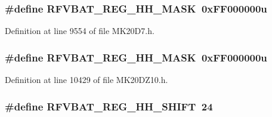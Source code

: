 \subsubsection[{\texorpdfstring{R\+F\+V\+B\+A\+T\+\_\+\+R\+E\+G\+\_\+\+H\+H\+\_\+\+M\+A\+SK}{RFVBAT_REG_HH_MASK}}]{\setlength{\rightskip}{0pt plus 5cm}\#define R\+F\+V\+B\+A\+T\+\_\+\+R\+E\+G\+\_\+\+H\+H\+\_\+\+M\+A\+SK~0x\+F\+F000000u}\hypertarget{group___r_f_v_b_a_t___register___masks_gad2932f13b6d26fa7ccb982b9cffcd184}{}\label{group___r_f_v_b_a_t___register___masks_gad2932f13b6d26fa7ccb982b9cffcd184}


Definition at line 9554 of file M\+K20\+D7.\+h.

\subsubsection[{\texorpdfstring{R\+F\+V\+B\+A\+T\+\_\+\+R\+E\+G\+\_\+\+H\+H\+\_\+\+M\+A\+SK}{RFVBAT_REG_HH_MASK}}]{\setlength{\rightskip}{0pt plus 5cm}\#define R\+F\+V\+B\+A\+T\+\_\+\+R\+E\+G\+\_\+\+H\+H\+\_\+\+M\+A\+SK~0x\+F\+F000000u}\hypertarget{group___r_f_v_b_a_t___register___masks_gad2932f13b6d26fa7ccb982b9cffcd184}{}\label{group___r_f_v_b_a_t___register___masks_gad2932f13b6d26fa7ccb982b9cffcd184}


Definition at line 10429 of file M\+K20\+D\+Z10.\+h.

\subsubsection[{\texorpdfstring{R\+F\+V\+B\+A\+T\+\_\+\+R\+E\+G\+\_\+\+H\+H\+\_\+\+S\+H\+I\+FT}{RFVBAT_REG_HH_SHIFT}}]{\setlength{\rightskip}{0pt plus 5cm}\#define R\+F\+V\+B\+A\+T\+\_\+\+R\+E\+G\+\_\+\+H\+H\+\_\+\+S\+H\+I\+FT~24}\hypertarget{group___r_f_v_b_a_t___register___masks_gae67376345507e381e7f56f8bae49359c}{}\label{group___r_f_v_b_a_t___register___masks_gae67376345507e381e7f56f8bae49359c}


